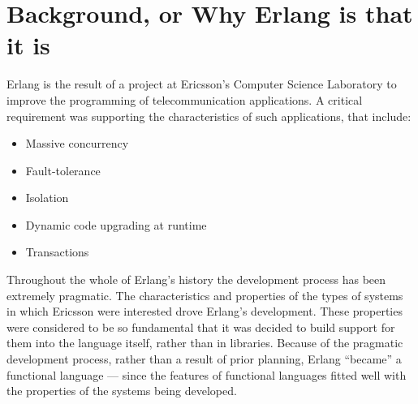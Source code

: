 \chapter{Background, or Why Erlang is that it is}
\label{background}

Erlang is the result of a project at Ericsson's Computer Science Laboratory to
improve the programming of telecommunication applications.  A critical
requirement was supporting the characteristics of such applications, that include:

\begin{itemize}
\item Massive concurrency

\item Fault-tolerance

\item Isolation

\item Dynamic code upgrading at runtime

\item Transactions
\end{itemize}

Throughout the whole of Erlang's history the development process has
been extremely pragmatic. The characteristics and properties of the
types of systems in which Ericsson were interested drove Erlang's
development.  These properties were considered to be so
fundamental that it was decided to build support for them into the
language itself, rather than in libraries.  Because of the pragmatic development
process, rather than a result of prior planning, Erlang ``became'' a functional language --- since
the features of functional languages fitted well with the properties of the systems being developed.

